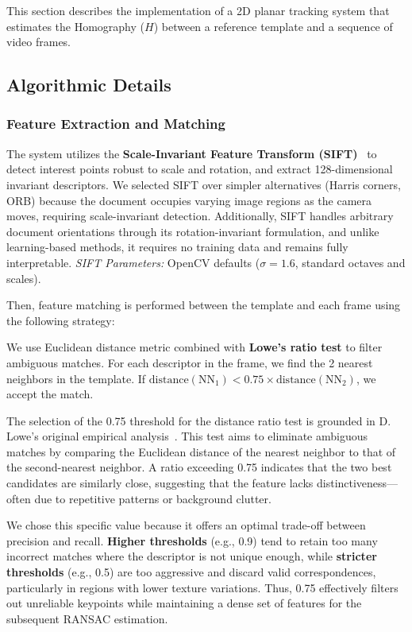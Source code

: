 \documentclass[10pt,twocolumn]{extarticle}
\begin{document}
This section describes the implementation of a 2D planar tracking system that estimates the Homography ($H$) between a reference template and a sequence of video frames.

\subsection{Algorithmic Details}

\subsubsection{Feature Extraction and Matching}

The system utilizes the \textbf{Scale-Invariant Feature Transform (SIFT)}~\cite{lowe2004} to detect interest points robust to scale and rotation, and extract 128-dimensional invariant descriptors. We selected SIFT over simpler alternatives (Harris corners, ORB) because the document occupies varying image regions as the camera moves, requiring scale-invariant detection. Additionally, SIFT handles arbitrary document orientations through its rotation-invariant formulation, and unlike learning-based methods, it requires no training data and remains fully interpretable. \textit{SIFT Parameters:} OpenCV defaults ($\sigma = 1.6$, standard octaves and scales).

Then, feature matching is performed between the template and each frame using the following strategy:

We use Euclidean distance metric combined with \textbf{Lowe's ratio test} to filter ambiguous matches. For each descriptor in the frame, we find the 2 nearest neighbors in the template. If $\text{distance}(\text{NN}_1) < 0.75 \times \text{distance}(\text{NN}_2)$, we accept the match.

The selection of the 0.75 threshold for the distance ratio test is grounded in D. Lowe's original empirical analysis~\cite{lowe2004}. This test aims to eliminate ambiguous matches by comparing the Euclidean distance of the nearest neighbor to that of the second-nearest neighbor. A ratio exceeding 0.75 indicates that the two best candidates are similarly close, suggesting that the feature lacks distinctiveness—often due to repetitive patterns or background clutter. 

We chose this specific value because it offers an optimal trade-off between precision and recall. \textbf{Higher thresholds} (e.g., 0.9) tend to retain too many incorrect matches where the descriptor is not unique enough, while \textbf{stricter thresholds} (e.g., 0.5) are too aggressive and discard valid correspondences, particularly in regions with lower texture variations. Thus, 0.75 effectively filters out unreliable keypoints while maintaining a dense set of features for the subsequent RANSAC estimation.
\end{document}
